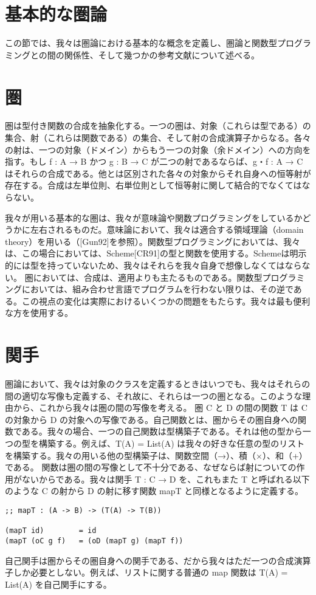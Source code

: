 \documentclass[11pt, oneside]{jsbook}   	%
\begin{document}
\section{基本的な圏論}
この節では、我々は圏論における基本的な概念を定義し、圏論と関数型プログラミングとの間の関係性、そして幾つかの参考文献について述べる。

\section{ 圏 }
圏は型付き関数の合成を抽象化する。一つの圏は、対象（これらは型である）の集合、射（これらは関数である）の集合、そして射の合成演算子からなる。各々の射は、一つの対象（ドメイン）からもう一つの対象（余ドメイン）への方向を指す。もし f : A → B かつ g : B → C が二つの射であるならば、g・f : A → C はそれらの合成である。他とは区別された各々の対象からそれ自身への恒等射が存在する。合成は左単位則、右単位則として恒等射に関して結合的でなくてはならない。

我々が用いる基本的な圏は、我々が意味論や関数プログラミングをしているかどうかに左右されるものだ。意味論において、我々は適合する領域理論（domain theory）を用いる（[Gun92]を参照）。関数型プログラミングにおいては、我々は、この場合においては、Scheme[CR91]の型と関数を使用する。Schemeは明示的には型を持っていないため、我々はそれらを我々自身で想像しなくてはならない。
圏においては、合成は、適用よりも主たるものである。関数型プログラミングにおいては、組み合わせ言語でプログラムを行わない限りは、その逆である。この視点の変化は実際におけるいくつかの問題をもたらす。我々は最も便利な方を使用する。
\section{ 関手 }
圏論において、我々は対象のクラスを定義するときはいつでも、我々はそれらの間の適切な写像も定義する、それ故に、それらは一つの圏となる。このような理由から、これから我々は圏の間の写像を考える。
圏 C と D の間の関数 T は C の対象から D の対象への写像である。自己関数とは、圏からその圏自身への関数である。我々の場合、一つの自己関数は型構築子である。それは他の型から一つの型を構築する。例えば、T(A) = List(A) は我々の好きな任意の型のリストを構築する。我々の用いる他の型構築子は、関数空間（→）、積（×）、和（+）である。
関数は圏の間の写像として不十分である、なぜならば射についての作用がないからである。我々は関手 T : C → D を、これもまた T と呼ばれる以下のような C の射から D の射に移す関数 mapT と同様となるように定義する。
\begin{lstlisting}
;; mapT : (A -> B) -> (T(A) -> T(B))

(mapT id)        = id
(mapT (oC g f)   = (oD (mapT g) (mapT f))
\end{lstlisting}
自己関手は圏からその圏自身への関手である、だから我々はただ一つの合成演算子しか必要としない。例えば、リストに関する普通の map 関数は T(A) = List(A) を自己関手にする。
\end{document}
